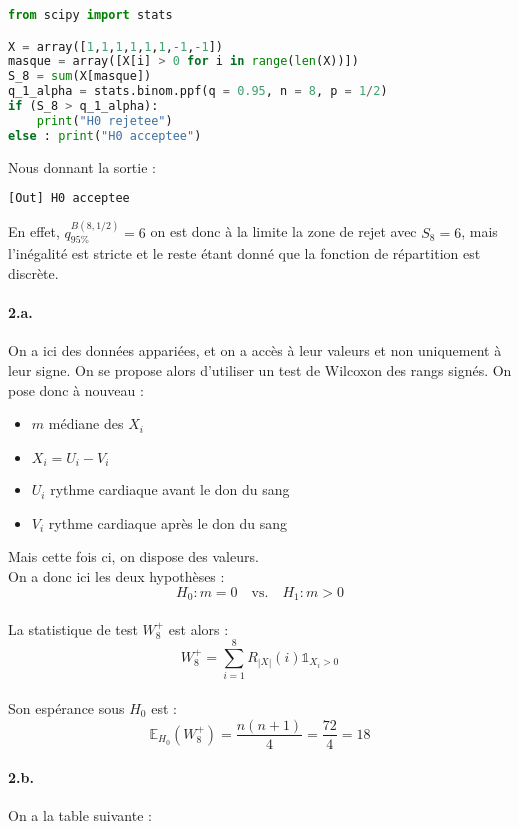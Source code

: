 \documentclass[a4paper,10pt]{report}
\begin{document}
\begin{lstlisting}[language=Python]
%pylab inline
from scipy import stats

X = array([1,1,1,1,1,1,-1,-1])
masque = array([X[i] > 0 for i in range(len(X))])
S_8 = sum(X[masque])
q_1_alpha = stats.binom.ppf(q = 0.95, n = 8, p = 1/2)
if (S_8 > q_1_alpha):
    print("H0 rejetee")
else : print("H0 acceptee")

\end{lstlisting}

Nous donnant la sortie :
\begin{lstlisting}[language=Python]
[Out] H0 acceptee
\end{lstlisting}

En effet, $q_{95\%}^{B(8,1/2)} = 6$ on est donc à la limite la zone de rejet avec $S_8 = 6$, mais l'inégalité est stricte et le reste étant donné que la fonction de répartition est discrète.


\paragraph{2.a.} On a ici des données appariées, et on a accès à leur valeurs et non uniquement à leur signe. On se propose alors d'utiliser un test de Wilcoxon des rangs signés. On pose donc à nouveau :
\begin{itemize}
\item $m$ médiane des $X_i$
\item $X_i = U_i - V_i$
\item $U_i$ rythme cardiaque avant le don du sang
\item $V_i$ rythme cardiaque après le don du sang
\end{itemize}
Mais cette fois ci, on dispose des valeurs.\\

On a donc ici les deux hypothèses :
$$
H_0 : m=0 \quad \text{vs.} \quad H_1 : m > 0
$$\\
\newline
La statistique de test $W_8^{+}$ est alors :
$$
W_8^{+} = \sum_{i=1}^8 R_{|X|}(i)\mathds{1}_{X_i > 0}
$$\\
Son espérance sous $H_0$ est :
$$
\mathbb{E}_{H_0}(W_8^{+}) = \frac{n(n+1)}{4} = \frac{72}{4} = 18
$$



\paragraph{2.b.} On a la table suivante :
\end{document}
